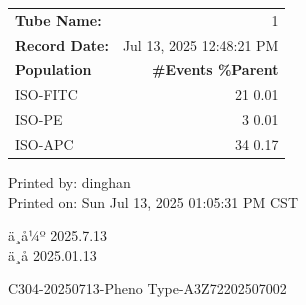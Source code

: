 \documentclass[UTF8,10pt,a4paper,fontset=fandol]{ctexart}
\newcommand{\fieldvalue}[1]{#1}
\newcommand{\handwritten}[1]{#1}
\begin{document}
\begin{center}
\small
\begin{tabular}{lr}
\textbf{Tube Name:} &
\fieldvalue{1}
\\
\textbf{Record Date:} &
\fieldvalue{Jul 13, 2025 12:48:21 PM}
\\[1mm]
\textbf{Population} & \textbf{\#Events \qquad \%Parent}\\
ISO-FITC &
\fieldvalue{21}
\quad
\fieldvalue{0.01}
\\
ISO-PE &
\fieldvalue{3}
\quad
\fieldvalue{0.01}
\\
ISO-APC &
\fieldvalue{34}
\quad
\fieldvalue{0.17}
\end{tabular}
\end{center}

\vfill

\begin{flushright}
\scriptsize
Printed by:%
\fieldvalue{dinghan}\\
Printed on:%
\fieldvalue{Sun Jul 13, 2025 01:05:31 PM CST}
\end{flushright}

\begin{flushright}
\handwritten{ä¸å¼º}\quad
\handwritten{2025.7.13}\\[2mm]
\handwritten{ä¸å­}\quad
\handwritten{2025.01.13}
\end{flushright}

\newpage

\begin{center}
C304-20250713-Pheno Type-A3Z72202507002
\end{center}
\end{document}
